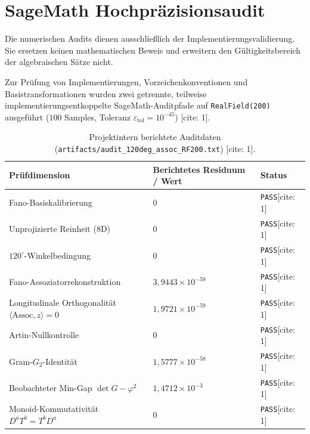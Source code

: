 \documentclass[11pt,a4paper]{article}
\newcommand{\Assoc}{\mathrm{Assoc}}
\begin{document}
	\section{SageMath Hochpräzisionsaudit}
	
	Die numerischen Audits dienen ausschließlich der Implementierungsvalidierung. Sie ersetzen keinen mathematischen Beweis und erweitern den Gültigkeitsbereich der algebraischen Sätze nicht.
	
	Zur Prüfung von Implementierungen, Vorzeichenkonventionen und Basistransformationen wurden zwei getrennte, teilweise implementierungsentkoppelte SageMath-Auditpfade auf \texttt{RealField(200)} ausgeführt ($100$ Samples, Toleranz $\varepsilon_{\mathrm{tol}} = 10^{-45}$) \cite{eabcAudit}[cite: 1].
	
	\begin{table}[h!]
		\centering
		\caption{Projektintern berichtete Auditdaten (\texttt{artifacts/audit\_120deg\_assoc\_RF200.txt}) \cite{eabcAudit}[cite: 1].}
		\vspace{0.5em}
		\begin{tabularx}{\textwidth}{@{}Xll@{}}
			\toprule
			\textbf{Prüfdimension} & \textbf{Berichtetes Residuum / Wert} & \textbf{Status} \\
			\midrule
			Fano-Basiskalibrierung & $0$ & \texttt{PASS}[cite: 1] \\
			Unprojizierte Reinheit (8D) & $0$ & \texttt{PASS}[cite: 1] \\
			$120^\circ$-Winkelbedingung & $0$ & \texttt{PASS}[cite: 1] \\
			Fano-Assoziatorrekonstruktion & $3{,}9443 \times 10^{-59}$ & \texttt{PASS}[cite: 1] \\
			Longitudinale Orthogonalität $\langle\Assoc, z\rangle = 0$ & $1{,}9721 \times 10^{-59}$ & \texttt{PASS}[cite: 1] \\
			Artin-Nullkontrolle & $0$ & \texttt{PASS}[cite: 1] \\
			Gram-$G_2$-Identität & $1{,}5777 \times 10^{-58}$ & \texttt{PASS}[cite: 1] \\
			Beobachteter Min-Gap $\det G - \varphi^2$ & $1{,}4712 \times 10^{-3}$ & \texttt{PASS}[cite: 1] \\
			Monoid-Kommutativität $D^a T^b = T^b D^a$ & $0$ & \texttt{PASS}[cite: 1] \\
			\bottomrule
		\end{tabularx}
	\end{table}
	
\end{document}
